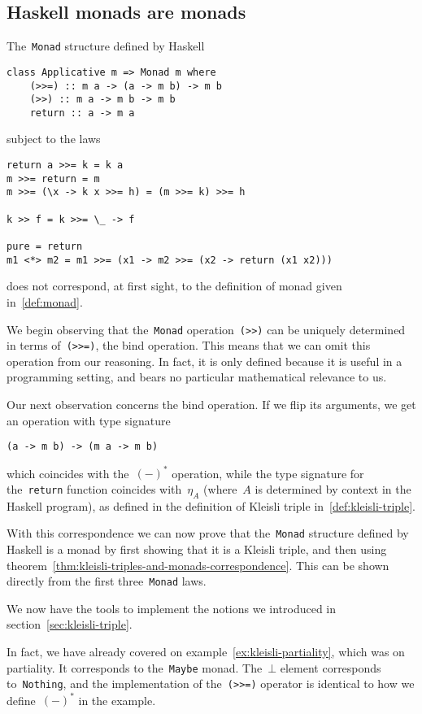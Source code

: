 \documentclass[../TFG.tex]{subfiles}
\begin{document}
\subsection{Haskell monads are monads}
The~\texttt{Monad} structure defined by Haskell
\begin{verbatim}
class Applicative m => Monad m where
    (>>=) :: m a -> (a -> m b) -> m b
    (>>) :: m a -> m b -> m b
    return :: a -> m a
\end{verbatim}
subject to the laws
\begin{verbatim}
return a >>= k = k a
m >>= return = m
m >>= (\x -> k x >>= h) = (m >>= k) >>= h

k >> f = k >>= \_ -> f

pure = return
m1 <*> m2 = m1 >>= (x1 -> m2 >>= (x2 -> return (x1 x2)))
\end{verbatim}
does not correspond, at first sight, to the definition of monad given
in~\ref{def:monad}.

We begin observing that the~\texttt{Monad}
operation~\texttt{(>>)} can be uniquely determined in terms
of~\texttt{(>>=)}, the bind operation.
This means that we can omit this operation from our reasoning. In fact, it is
only defined because it is useful in a programming setting, and bears no
particular mathematical relevance to us.

Our next observation concerns the bind operation. If we flip its arguments, we
get an operation with type signature
\begin{verbatim}
(a -> m b) -> (m a -> m b)
\end{verbatim}
which coincides with the~\((-)^{\ast}\) operation, while the type signature for
the~\texttt{return} function coincides with~\(\eta_{A}\)
(where~\(A\) is determined by context in the Haskell program), as defined in the
definition of Kleisli triple in~\ref{def:kleisli-triple}.

With this correspondence we can now prove that the~\texttt{Monad}
structure defined by Haskell is a monad by first showing that it is a Kleisli
triple, and then using
theorem~\ref{thm:kleisli-triples-and-monads-correspondence}. This can be shown
directly from the first three~\texttt{Monad} laws.

We now have the tools to implement the notions we introduced in
section~\ref{sec:kleisli-triple}.

In fact, we have already covered on example~\ref{ex:kleisli-partiality}, which
was on partiality. It corresponds to the~\texttt{Maybe} monad.
The~\(\bot\) element corresponds to~\texttt{Nothing}, and the
implementation of the~\texttt{(>>=)} operator is identical to how
we define~\((-)^{\ast}\) in the example.
\end{document}
